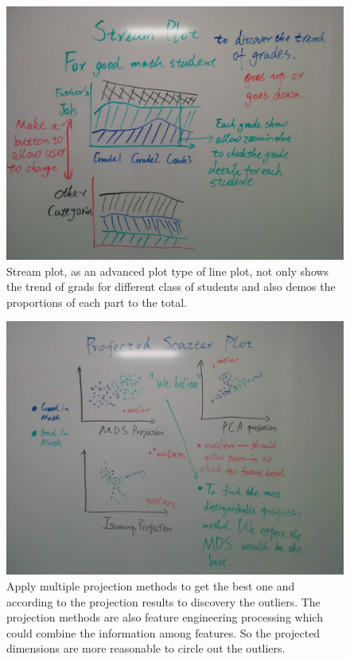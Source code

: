 \documentclass{article}
\begin{document}
\begin{figure}[H]
\centering
\includegraphics[scale=0.25]{stream_plot.jpg}
\caption{Stream plot, as an advanced plot type of line plot, not only shows the trend of grads for different class of students and also demos the proportions of each part to the total.}
\end{figure}

\begin{figure}[H]
\centering
\includegraphics[scale=0.25]{projected_scatter.jpg}
\caption{Apply multiple projection methods to get the best one and according to the projection results to discovery the outliers. The projection methods are also feature engineering processing which could combine the information among features. So the projected dimensions are more reasonable to circle out the outliers.}
\end{figure}
\end{document}
